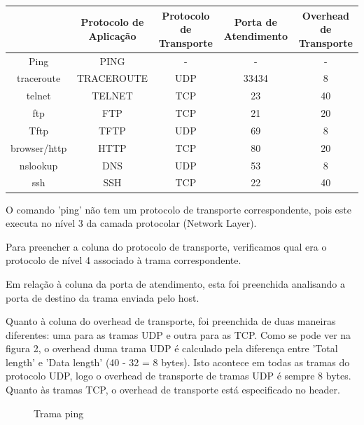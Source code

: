 \documentclass[11pt]{article}
\begin{document}
\begin{table}[hbt!]
    \begin{adjustbox}{width=\textwidth}
        \begin{tabular}{|c|c|c|c|c|}
\hline
& Protocolo de Aplicação & Protocolo de Transporte & Porta de Atendimento & Overhead de Transporte \\
\hline
Ping         & PING        &  -    &   -     &   -   \\
\hline
traceroute   & TRACEROUTE  & UDP   & 33434   & 8     \\
\hline
telnet       & TELNET      & TCP   & 23      & 40    \\
\hline
ftp          & FTP         & TCP   & 21      & 20    \\
\hline
Tftp         & TFTP        & UDP   & 69      & 8     \\
\hline
browser/http & HTTP        & TCP   & 80      & 20    \\
\hline
nslookup     & DNS         & UDP   & 53      & 8     \\
\hline
ssh          & SSH         & TCP   & 22      & 40    \\
\hline
        \end{tabular}
    \end{adjustbox}
\end{table}

O comando 'ping' não tem um protocolo de transporte correspondente, pois este executa no nível 3 da camada protocolar (Network Layer).

Para preencher a coluna do protocolo de transporte, verificamos qual era o protocolo de nível 4 associado à trama correspondente.

Em relação à coluna da porta de atendimento, esta foi preenchida analisando a porta de destino da trama enviada pelo host.

Quanto à coluna do overhead de transporte, foi preenchida de duas maneiras diferentes: uma para as tramas UDP e outra para as TCP. Como se pode ver na figura 2, o overhead duma trama UDP é calculado pela diferença entre 'Total length' e 'Data length' (40 - 32 = 8 bytes). Isto acontece em todas as tramas do protocolo UDP, logo o overhead de transporte de tramas UDP é sempre 8 bytes. Quanto às tramas TCP, o overhead de transporte está especificado no header.

\vspace{0.5cm}

\begin{figure}[hbt!]
    \centering
    \caption{Trama ping}
\end{figure}
\end{document}
